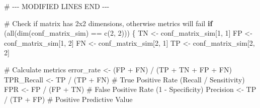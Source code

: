 \documentclass[
  letterpaper,
  DIV=11,
  numbers=noendperiod]{scrreprt}
\newenvironment{Shaded}{\begin{snugshade}}{\end{snugshade}}
\newcommand{\CommentTok}[1]{\textcolor[rgb]{0.37,0.37,0.37}{#1}}
\newcommand{\ControlFlowTok}[1]{\textcolor[rgb]{0.00,0.23,0.31}{\textbf{#1}}}
\newcommand{\DecValTok}[1]{\textcolor[rgb]{0.68,0.00,0.00}{#1}}
\newcommand{\FunctionTok}[1]{\textcolor[rgb]{0.28,0.35,0.67}{#1}}
\newcommand{\NormalTok}[1]{\textcolor[rgb]{0.00,0.23,0.31}{#1}}
\newcommand{\OtherTok}[1]{\textcolor[rgb]{0.00,0.23,0.31}{#1}}
\newcommand{\RegionMarkerTok}[1]{\textcolor[rgb]{0.00,0.23,0.31}{#1}}
\newcommand{\SpecialCharTok}[1]{\textcolor[rgb]{0.37,0.37,0.37}{#1}}
\begin{document}
\begin{Shaded}
\begin{Highlighting}[]
\CommentTok{\# {-}{-}{-} MODIFIED LINES }\RegionMarkerTok{END}\CommentTok{ {-}{-}{-}}


\CommentTok{\# Check if matrix has 2x2 dimensions, otherwise metrics will fail}
\ControlFlowTok{if}\NormalTok{ (}\FunctionTok{all}\NormalTok{(}\FunctionTok{dim}\NormalTok{(conf\_matrix\_sim) }\SpecialCharTok{==} \FunctionTok{c}\NormalTok{(}\DecValTok{2}\NormalTok{, }\DecValTok{2}\NormalTok{))) \{}
\NormalTok{  TN }\OtherTok{\textless{}{-}}\NormalTok{ conf\_matrix\_sim[}\DecValTok{1}\NormalTok{, }\DecValTok{1}\NormalTok{]}
\NormalTok{  FP }\OtherTok{\textless{}{-}}\NormalTok{ conf\_matrix\_sim[}\DecValTok{1}\NormalTok{, }\DecValTok{2}\NormalTok{]}
\NormalTok{  FN }\OtherTok{\textless{}{-}}\NormalTok{ conf\_matrix\_sim[}\DecValTok{2}\NormalTok{, }\DecValTok{1}\NormalTok{]}
\NormalTok{  TP }\OtherTok{\textless{}{-}}\NormalTok{ conf\_matrix\_sim[}\DecValTok{2}\NormalTok{, }\DecValTok{2}\NormalTok{]}

  \CommentTok{\# Calculate metrics}
\NormalTok{  error\_rate }\OtherTok{\textless{}{-}}\NormalTok{ (FP }\SpecialCharTok{+}\NormalTok{ FN) }\SpecialCharTok{/}\NormalTok{ (TP }\SpecialCharTok{+}\NormalTok{ TN }\SpecialCharTok{+}\NormalTok{ FP }\SpecialCharTok{+}\NormalTok{ FN)}
\NormalTok{  TPR\_Recall }\OtherTok{\textless{}{-}}\NormalTok{ TP }\SpecialCharTok{/}\NormalTok{ (TP }\SpecialCharTok{+}\NormalTok{ FN) }\CommentTok{\# True Positive Rate (Recall / Sensitivity)}
\NormalTok{  FPR }\OtherTok{\textless{}{-}}\NormalTok{ FP }\SpecialCharTok{/}\NormalTok{ (FP }\SpecialCharTok{+}\NormalTok{ TN)      }\CommentTok{\# False Positive Rate (1 {-} Specificity)}
\NormalTok{  Precision }\OtherTok{\textless{}{-}}\NormalTok{ TP }\SpecialCharTok{/}\NormalTok{ (TP }\SpecialCharTok{+}\NormalTok{ FP)  }\CommentTok{\# Positive Predictive Value}


\end{Highlighting}
\end{Shaded}
\end{document}
